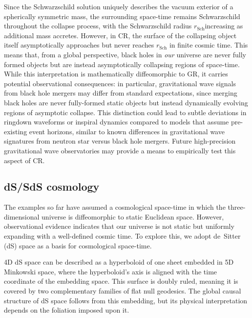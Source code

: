 \documentclass[aps,prd,reprint,superscriptaddress]{revtex4-2}
\begin{document}
Since the Schwarzschild solution uniquely describes the vacuum exterior of a spherically symmetric mass, the surrounding space-time remains Schwarzschild throughout the collapse process, with the Schwarzschild radius $r_{\mathrm{Sch}}$increasing as additional mass accretes. However, in CR, the surface of the collapsing object itself asymptotically approaches but never reaches $r_{\mathrm{Sch}}$ in finite cosmic time. This means that, from a global perspective, black holes in \textit{our} universe are never fully formed objects but are instead asymptotically collapsing regions of space-time. While this interpretation is mathematically diffeomorphic to GR, it carries potential observational consequences: in particular, gravitational wave signals from black hole mergers may differ from standard expectations, since merging black holes are never fully-formed static objects but instead dynamically evolving regions of asymptotic collapse. This distinction could lead to subtle deviations in ringdown waveforms or inspiral dynamics compared to models that assume pre-existing event horizons, similar to known differences in gravitational wave signatures from neutron star versus black hole mergers. Future high-precision gravitational wave observatories may provide a means to empirically test this aspect of CR.

\subsection{dS/SdS cosmology}

The examples so far have assumed a cosmological space-time in which the three-dimensional universe is diffeomorphic to static Euclidean space. However, observational evidence indicates that our universe is not static but uniformly expanding with a well-defined cosmic time. To explore this, we adopt de~Sitter (dS) space as a basis for cosmological space-time.

4D dS space can be described as a hyperboloid of one sheet embedded in 5D Minkowski space, where the hyperboloid's axis is aligned with the time coordinate of the embedding space. This surface is doubly ruled, meaning it is covered by two complementary families of flat null geodesics. The global causal structure of dS space follows from this embedding, but its physical interpretation depends on the foliation imposed upon it.
\end{document}
